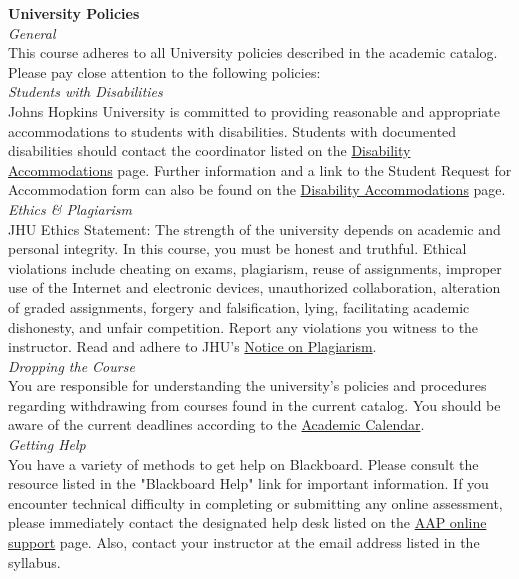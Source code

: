 \documentclass[11pt]{article}
\begin{document}
\newpage
\large \textbf{University Policies} \\
\emph{General} \\
This course adheres to all University policies described in the academic catalog. Please pay close attention to the following policies: \\
\emph{Students with Disabilities}\\
Johns Hopkins University is committed to providing reasonable and appropriate accommodations to students with disabilities. Students with documented disabilities should contact the coordinator listed on the \href{http://advanced.jhu.edu/current-students/current-students-resources/disability-accommodations/}{Disability Accommodations} page. Further information and a link to the Student Request for Accommodation form can also be found on the \href{http://advanced.jhu.edu/current-students/current-students-resources/disability-accommodations/}{Disability Accommodations} page.  \\
\emph{Ethics \& Plagiarism} \\
JHU Ethics Statement: The strength of the university depends on academic and personal integrity. In this course, you must be honest and truthful. Ethical violations include cheating on exams, plagiarism, reuse of assignments, improper use of the Internet and electronic devices, unauthorized collaboration, alteration of graded assignments, forgery and falsification, lying, facilitating academic dishonesty, and unfair competition. Report any violations you witness to the instructor.
Read and adhere to JHU’s \href{http://advanced.jhu.edu/current-students/policies/notice-on-plagiarism-2/}{Notice on Plagiarism}. \\
\emph{Dropping the Course} \\
You are responsible for understanding the university’s policies and procedures regarding withdrawing from courses found in the current catalog. You should be aware of the current deadlines according to the \href{http://advanced.jhu.edu/current-students/academic-calendar/}{Academic Calendar}. \\
\emph{Getting Help} \\
You have a variety of methods to get help on Blackboard. Please consult the resource listed in the "Blackboard Help" link for important information. If you encounter technical difficulty in completing or submitting any online assessment, please immediately contact the designated help desk listed on the \href{http://advanced.jhu.edu/academics/online-programs/support/}{AAP online support} page. Also, contact your instructor at the email address listed in the syllabus. \\
\end{document}
